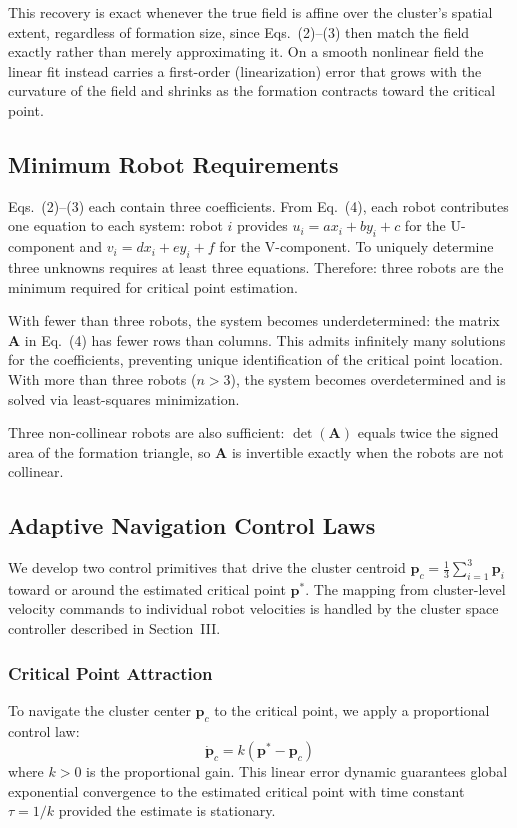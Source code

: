 \documentclass[lettersize,journal]{IEEEtran}
\begin{document}
This recovery is exact whenever the true field is affine over the cluster's spatial extent, regardless of formation size, since Eqs.~(2)--(3) then match the field exactly rather than merely approximating it. On a smooth nonlinear field the linear fit instead carries a first-order (linearization) error that grows with the curvature of the field and shrinks as the formation contracts toward the critical point.


\subsection{Minimum Robot Requirements}

Eqs.~(2)--(3) each contain three coefficients. From Eq.~(4), each robot contributes one equation to each system: robot $i$ provides $u_i = ax_i + by_i + c$ for the U-component and $v_i = dx_i + ey_i + f$ for the V-component. To uniquely determine three unknowns requires at least three equations. Therefore: three robots are the minimum required for critical point estimation.

With fewer than three robots, the system becomes underdetermined: the matrix $\mathbf{A}$ in Eq.~(4) has fewer rows than columns. This admits infinitely many solutions for the coefficients, preventing unique identification of the critical point location. With more than three robots ($n > 3$), the system becomes overdetermined and is solved via least-squares minimization.

Three non-collinear robots are also sufficient: $\det(\mathbf{A})$ equals twice the signed area of the formation triangle, so $\mathbf{A}$ is invertible exactly when the robots are not collinear.


\subsection{Adaptive Navigation Control Laws}
\label{sec:control_primitives}

We develop two control primitives that drive the cluster centroid $\mathbf{p}_c = \frac{1}{3}\sum_{i=1}^{3}\mathbf{p}_i$ toward or around the estimated critical point $\mathbf{p}^*$. The mapping from cluster-level velocity commands to individual robot velocities is handled by the cluster space controller described in Section~III.

\subsubsection{Critical Point Attraction}
To navigate the cluster center $\mathbf{p}_c$ to the critical point, we apply a proportional control law:
\begin{equation}
\dot{\mathbf{p}}_c = k(\mathbf{p}^* - \mathbf{p}_c)
\end{equation}
where $k > 0$ is the proportional gain. This linear error dynamic guarantees global exponential convergence to the estimated critical point with time constant $\tau = 1/k$ provided the estimate is stationary.
\end{document}
